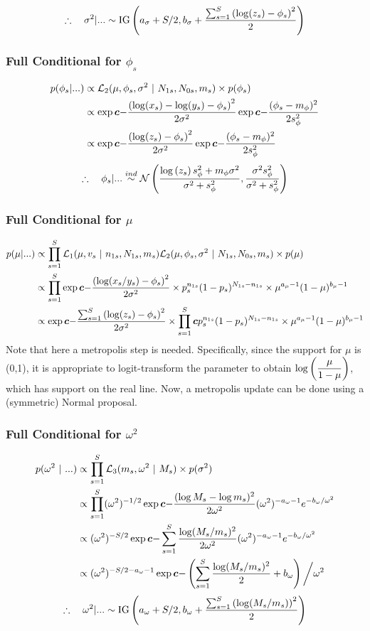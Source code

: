 \documentclass[12pt]{article}
\newcommand{\bc}{\mbox{\boldmath $c$}}
\begin{document}
$$
\therefore ~~~ \sigma^2|... \sim \text{IG}\left(a_\sigma+S/2, b_\sigma+\frac{\sum_{s=1}^S\left(\log(z_s)-\phi_s\right)^2}{2}\right)
$$

\subsubsection{Full Conditional for $\phi_s$}
\begin{align*}
  p(\phi_s|...) &\propto\LTwo \times p(\phi_s)\\
                &\propto\exp\bc{-\frac{\p{\log(x_s)-\log(y_s)-\phi_s}^2}{2\sigma^2}}
  \exp\bc{-\frac{(\phi_s-m_\phi)^2}{2s_\phi^2}}\\
                &\propto\exp\bc{-\frac{\p{\log(z_s)-\phi_s}^2}{2\sigma^2}} 
  \exp\bc{-\frac{(\phi_s-m_\phi)^2}{2s_\phi^2}}\\
\end{align*}
$$
\therefore ~~~ \phi_s | ... \overset{ind}{\sim}  \mathcal N\left(\frac{\log\left(z_s\right)s_\phi^2+m_\phi\sigma^2}{\sigma^2+s_\phi^2},\frac{\sigma^2 s_\phi^2}{\sigma^2+s_\phi^2}\right)
$$

\subsubsection{Full Conditional for $\mu$}
\begin{align*}
  p(\mu|...) &\propto \prods \LOne\LTwo \times p(\mu) \\
             &\propto \prods \exp\bc{-\frac{\p{\log(x_s/y_s)-\phi_s}^2}{2\sigma^2}} \times p_s^{n_{1s}} (1-p_s)^{N_{1s}-n_{1s}} \times \mu^{a_\mu-1} (1-\mu)^{b_\mu-1}\\
             &\propto \exp\bc{-\frac{\sums\p{\log(z_s)-\phi_s}^2}{2\sigma^2}} \times \prods\bc{p_s^{n_{1s}} (1-p_s)^{N_{1s}-n_{1s}}} \times \mu^{a_\mu-1} (1-\mu)^{b_\mu-1}\\
\end{align*}
Note that here a metropolis step is needed. Specifically, since the support for
$\mu$ is (0,1), it is appropriate to logit-transform the parameter to obtain
$\log\left(\displaystyle\frac{\mu}{1-\mu}\right)$, which has support on the real line. Now, a
metropolis update can be done using a (symmetric) Normal proposal.

\subsubsection{Full Conditional for $\omega^2$}
\begin{align*}
p(\omega^2 ~|~ ...) &\propto \prods \LThree \times p(\sigma^2)\\
                    &\propto \prods (\omega^2)^{-1/2} \exp\bc{-\frac{(\log M_s - \log m_s)^2}{2\omega^2}} (\omega^2)^{-a_\omega-1}e^{-b_\omega/\omega^2} \\
                    &\propto (\omega^2)^{-S/2}\exp\bc{-\sums\frac{\log(M_s/m_s)^2}{2\omega^2}} (\omega^2)^{-a_\omega-1}e^{-b_\omega/\omega^2} \\
                    &\propto (\omega^2)^{-S/2-a_\omega-1}\exp\bc{-\p{\sums\frac{\log(M_s/m_s)^2}{2} + b_\omega} \bigg/ \omega^2} \\
\end{align*}
$$
\therefore ~~~ \omega^2|... \sim \text{IG}\left(a_\omega+S/2, b_\omega+\frac{\sum_{s=1}^S\left(\log(M_s/m_s)\right)^2}{2}\right)
$$
\end{document}
